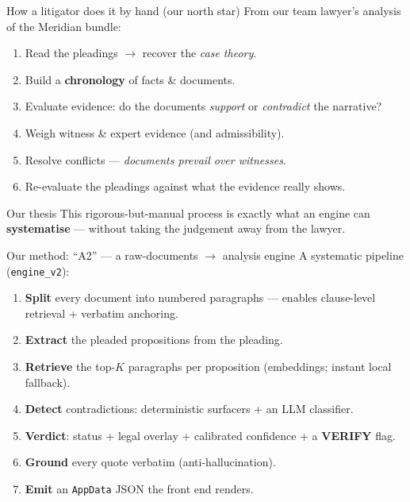 \documentclass[aspectratio=169,10pt]{beamer}
\newcommand{\verify}{\textcolor{warnamber}{\textbf{VERIFY}}}
\begin{document}
\begin{frame}{How a litigator does it by hand (our north star)}
  From our team lawyer's analysis of the Meridian bundle:
  \begin{enumerate}
    \item Read the pleadings $\rightarrow$ recover the \emph{case theory}.
    \item Build a \textbf{chronology} of facts \& documents.
    \item Evaluate evidence: do the documents \emph{support} or
          \emph{contradict} the narrative?
    \item Weigh witness \& expert evidence (and admissibility).
    \item Resolve conflicts --- \emph{documents prevail over witnesses}.
    \item Re-evaluate the pleadings against what the evidence really shows.
  \end{enumerate}
  \medskip
  \begin{alertblock}{Our thesis}
    This rigorous-but-manual process is exactly what an engine can
    \textbf{systematise} --- without taking the judgement away from the lawyer.
  \end{alertblock}
\end{frame}

\begin{frame}{Our method: ``A2'' --- a raw-documents $\rightarrow$ analysis engine}
  A systematic pipeline (\texttt{engine\_v2}):
  \begin{enumerate}
    \item \textbf{Split} every document into \alert{numbered paragraphs}
          --- enables clause-level retrieval + verbatim anchoring.
    \item \textbf{Extract} the pleaded propositions from the pleading.
    \item \textbf{Retrieve} the top-$K$ paragraphs per proposition (embeddings;
          instant local fallback).
    \item \textbf{Detect} contradictions: deterministic surfacers + an LLM
          classifier.
    \item \textbf{Verdict}: status + legal overlay + calibrated confidence +
          a \verify{} flag.
    \item \textbf{Ground} every quote \alert{verbatim} (anti-hallucination).
    \item \textbf{Emit} an \texttt{AppData} JSON the front end renders.
  \end{enumerate}
\end{frame}
\end{document}
